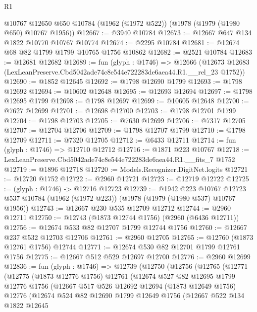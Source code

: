 \begin{lexlean}{R1}
\begin{coremodule}
    @10767
    @12650
    @650
    @10784
    (@1962 (@1972 @522))
    (@1978 (@1979 (@1980 @650) @10767 @1956))
@12667 := @3940 @10784
@12673 := @12667 @647 @134 @1822 @10770 @10767 @10774
@12674 := @2295 @10784
@12681 := @12674 @68 @82 @1799 @1799 @10765 @1756 @10862
@12682 := @2521 @10784
@12683 := @12681 @12682
@12689 := fun (glyph : @1746) =>
  @12666 (@12673 @12683 (LexLeanPreserve.Cbd5042ade74c8e544e722283de6aea44.R1.__rel_23 @1752))
@12690 := @1852 @12645
@12692 := @1798 @12690 @1799
@12693 := @1798 @12692
@12694 := @10602 @12648
@12695 := @12693 @12694
@12697 := @1798 @12695 @1799
@12698 := @1798 @12697
@12699 := @10605 @12648
@12700 := @7627 @12699
@12701 := @12698 @12700
@12703 := @1798 @12701 @1799
@12704 := @1798 @12703
@12705 := @7630 @12699
@12706 := @7317 @12705
@12707 := @12704 @12706
@12709 := @1798 @12707 @1799
@12710 := @1798 @12709
@12711 := @7320 @12705
@12712 := @6433 @12711
@12714 := fun (glyph : @1746) => @12710 @12712
@12716 := @1871 @223 @10767
@12718 := LexLeanPreserve.Cbd5042ade74c8e544e722283de6aea44.R1.__fits_7 @1752
@12719 := @1896 @12718
@12720 := Models.Recognizer.DigitNet.logits
@12721 := @12720 @1752
@12722 := @2960 @12721
@12723 := @12719 @12722
@12725 := (glyph : @1746) -> @12716 @12723
@12739 := @1942
    @223
    @10767
    @12723
    @537
    @10784
    (@1962 (@1972 @223))
    (@1978 (@1979 (@1980 @537) @10767 @1956))
@12743 := @12667 @230 @535 @12709 @12712
@12744 := @2960 @12711
@12750 := @12743 (@1873 @12744 @1756) (@2960 (@6436 @12711))
@12756 := @12674 @533 @82 @12707 @1799 @12744 @1756
@12760 := @12667 @237 @532 @12703 @12706
@12761 := @2960 @12705
@12765 := @12760 (@1873 @12761 @1756) @12744
@12771 := @12674 @530 @82 @12701 @1799 @12761 @1756
@12775 := @12667 @512 @529 @12697 @12700
@12776 := @2960 @12699
@12836 := fun (glyph : @1746) =>
  @12739
    (@12750
      (@12756
        (@12765
          (@12771
            (@12775
              (@1873 @12776 @1756)
              @12761
              (@12674
                @527
                @82
                @12695
                @1799
                @12776
                @1756
                (@12667
                  @517
                  @526
                  @12692
                  @12694
                  (@1873 @12649 @1756)
                  @12776
                  (@12674
                    @524
                    @82
                    @12690
                    @1799
                    @12649
                    @1756
                    (@12667
                      @522
                      @134
                      @1822
                      @12645

\end{coremodule}
\end{lexlean}
